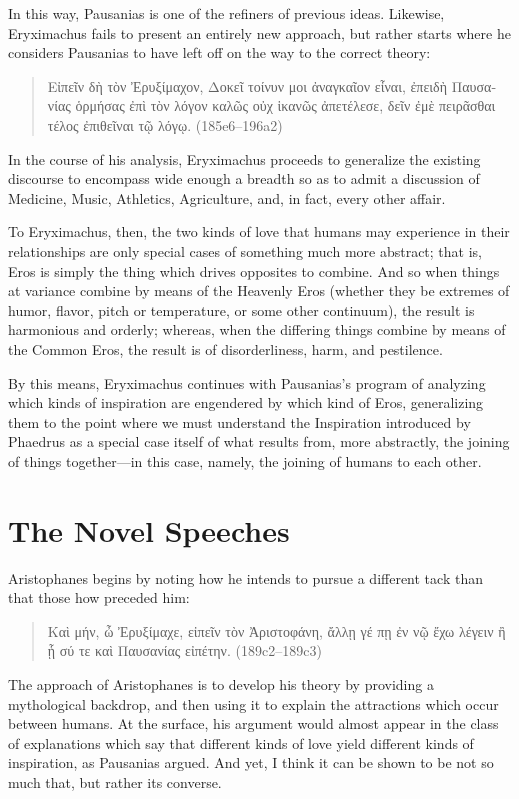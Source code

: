 In this way, Pausanias is one of the refiners of previous ideas.
Likewise, Eryximachus fails to present an entirely new approach, but
rather starts where he considers Pausanias to have left off on the way
to the correct theory:

\begin{quote}
\textgreek{Εἰπεῖν δὴ τὸν Ἐρυξίμαχον, Δοκεῖ τοίνυν μοι ἀναγκαῖον εἶναι,
ἐπειδὴ Παυσανίας ὁρμήσας ἐπὶ τὸν λόγον καλῶς οὐχ ἱκανῶς ἀπετέλεσε,
δεῖν ἐμὲ πειρᾶσθαι τέλος ἐπιθεῖναι τῷ λόγῳ.} (185e6--196a2)
\end{quote}

In the course of his analysis, Eryximachus proceeds to generalize the
existing discourse to encompass wide enough a breadth so as to admit a
discussion of Medicine, Music, Athletics, Agriculture, and, in fact,
every other affair.

To Eryximachus, then, the two kinds of love that humans may experience
in their relationships are only special cases of something much more
abstract; that is, Eros is simply the thing which drives opposites to
combine. And so when things at variance combine by means of the Heavenly
Eros (whether they be extremes of humor, flavor, pitch or temperature,
or some other continuum), the result is harmonious and orderly; whereas,
when the differing things combine by means of the Common Eros, the
result is of disorderliness, harm, and pestilence.

By this means, Eryximachus continues with Pausanias's program of
analyzing which kinds of inspiration are engendered by which kind of
Eros, generalizing them to the point where we must understand the
Inspiration introduced by Phaedrus as a special case itself of what
results from, more abstractly, the joining of things together---in this
case, namely, the joining of humans to each other.

\section{The Novel Speeches}

Aristophanes begins by noting how he intends to pursue a different tack
than that those how preceded him:

\begin{quote}
\textgreek{Καὶ μήν, ὦ Ἐρυξίμαχε, εἰπεῖν τὸν Ἀριστοφάνη, ἄλλῃ γέ πῃ ἐν
νῷ ἔχω λέγειν ἢ  ᾗ σύ τε καὶ Παυσανίας εἰπέτην.} (189c2--189c3)
\end{quote}

The approach of Aristophanes is to develop his theory by providing a
mythological backdrop, and then using it to explain the attractions
which occur between humans. At the surface, his argument would almost
appear in the class of explanations which say that different kinds of
love yield different kinds of inspiration, as Pausanias argued. And yet,
I think it can be shown to be not so much that, but rather its converse.

